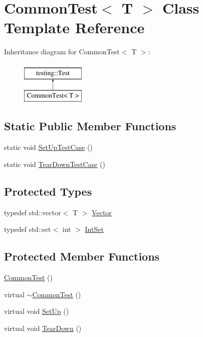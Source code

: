 \hypertarget{class_common_test}{\section{Common\-Test$<$ T $>$ Class Template Reference}
\label{class_common_test}
}
Inheritance diagram for Common\-Test$<$ T $>$\-:\begin{figure}[H]
\begin{center}
\leavevmode
\includegraphics[height=2.000000cm]{class_common_test}
\end{center}
\end{figure}
\subsection*{Static Public Member Functions}
\begin{DoxyCompactItemize}
\item 
static void \hyperlink{class_common_test_a6edd90f32f45cc49e4a423b22bd770ce}{Set\-Up\-Test\-Case} ()
\item 
static void \hyperlink{class_common_test_a68d2bf5108cf28478331588fbdff4838}{Tear\-Down\-Test\-Case} ()
\end{DoxyCompactItemize}
\subsection*{Protected Types}
\begin{DoxyCompactItemize}
\item 
typedef std\-::vector$<$ T $>$ \hyperlink{class_common_test_a6dfdcede6964887b9f4254a0e0478e37}{Vector}
\item 
typedef std\-::set$<$ int $>$ \hyperlink{class_common_test_a62827e9d3064cddf4a8698747f1bd434}{Int\-Set}
\end{DoxyCompactItemize}
\subsection*{Protected Member Functions}
\begin{DoxyCompactItemize}
\item 
\hyperlink{class_common_test_abd5ec205d90f4b81efab2a6f972f3db0}{Common\-Test} ()
\item 
virtual \hyperlink{class_common_test_a675a632fcf7b1fd961fefc619d6a458d}{$\sim$\-Common\-Test} ()
\item 
virtual void \hyperlink{class_common_test_a4c7bf7889ce48a9d06530bc4a437f3f5}{Set\-Up} ()
\item 
virtual void \hyperlink{class_common_test_aeae195c2cefa956c6ae5be1226e6ecd8}{Tear\-Down} ()
\end{DoxyCompactItemize}
